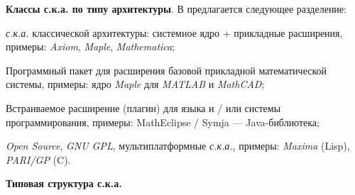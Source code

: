 \textbf{Классы с.к.а. по типу архитектуры}. В  предлагается следующее разделение:
\begin{textitemize}
	\item \textit{с.к.а.} классической архитектуры: системное ядро + прикладные расширения, примеры: \textit{Axiom}, \textit{Maple}, \textit{Mathematica};
	\item Программный пакет для расширения базовой прикладной математической системы, примеры: ядро \textit{Maple} для \textit{MATLAB} и \textit{MathCAD};
	\item Встраиваемое расширение (плагин) для языка и / или системы программирования, примеры: MathEclipse / Symja --- Java-библиотека;
	\item \textit{Open Source}, \textit{GNU GPL}, мультиплатформные \textit{с.к.а.}, примеры: \textit{Maxima} (Lisp), \textit{PARI/GP} (C).
\end{textitemize}

\textbf{Типовая структура с.к.а.}

